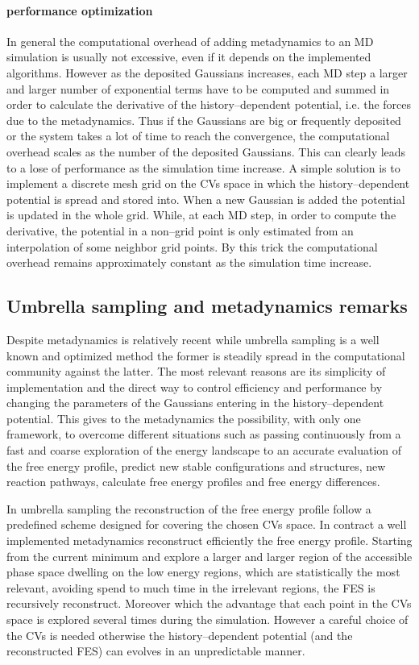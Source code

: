\paragraph{\textbf{performance optimization}} In general the computational overhead of adding metadynamics to an \ac{MD} simulation is usually not excessive, even if it depends on the implemented algorithms. However as the deposited Gaussians increases, each \ac{MD} step a larger and larger number of exponential terms have to be computed and summed in order to calculate the derivative of the history--dependent potential, i.e. the forces due to the metadynamics. Thus if the Gaussians are big or frequently deposited or the system takes a lot of time to reach the convergence, the computational overhead scales as the number of the deposited Gaussians. This can clearly leads to a lose of performance as the simulation time increase. A simple solution is to implement a discrete mesh grid on the \acp{CV} space in which the history--dependent potential is spread and stored into. When a new Gaussian is added the potential is updated in the whole grid. While, at each \ac{MD} step, in order to compute the derivative, the potential in a non--grid point is only estimated from an interpolation of some neighbor grid points. By this trick the computational overhead remains approximately constant as the simulation time increase.

\subsection{Umbrella sampling and metadynamics remarks}
Despite metadynamics is relatively recent while umbrella sampling is a well known and optimized method the former is steadily spread in the computational community against the latter. The most relevant reasons are its simplicity of implementation and the direct way to control efficiency and performance by changing the parameters of the Gaussians entering in the history--dependent potential. This gives to the metadynamics the possibility, with only one framework, to overcome different situations such as passing continuously from a fast and coarse exploration of the energy landscape to an accurate evaluation of the free energy profile, predict new stable configurations and structures, new reaction pathways, calculate free energy profiles and free energy differences.

In umbrella sampling the reconstruction of the free energy profile follow a predefined scheme designed for covering the chosen \acp{CV} space. In contract a well implemented metadynamics reconstruct efficiently the free energy profile. Starting from the current minimum and explore a larger and larger region of the accessible phase space dwelling on the low energy regions, which are statistically the most relevant, avoiding spend to much time in the irrelevant regions, the \ac{FES} is recursively reconstruct. Moreover which the advantage that each point in the \acp{CV} space is explored several times during the simulation. However a careful choice of the \acp{CV} is needed otherwise the history--dependent potential (and the reconstructed \ac{FES}) can evolves in an unpredictable manner.   

